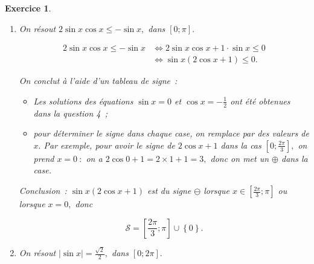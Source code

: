 \documentclass[10pt]{article}
\newtheorem{exo}{Exercice}
\begin{document}
\begin{exo}
\begin{enumerate}
\textbf{Remarque~:} Les solutions dans la partie basse du cercle correspondent à l'intervalle $\left[-\pi;-\frac{\pi}{4}\right],$ les  solutions dans la partie haute correspondent à l'intervalle $\left[\frac{\pi}{4};\pi\right].$
 


\item \begin{multicols}{2} On résout $2\sin x\cos x\leq -\sin x,$ dans $\left[0;\pi\right].$

\medskip

\begin{align*}2\sin x\cos x\leq-\sin x&\iff 2\sin x\cos x+1\cdot\sin x\leq 0
\\&\iff \sin x(2\cos x+1)\leq 0.
\end{align*}

On conclut à l'aide d'un tableau de signe~:

\begin{itemize}
\item[\textbullet] Les solutions des équations $\sin x=0$ et $\cos x=-\frac{1}{2}$ ont été obtenues dans la question 4~;
\item[\textbullet] pour déterminer le signe dans chaque case, on remplace par des valeurs de $x.$ Par exemple, pour avoir le signe de $2\cos x+1$ dans la cas $\left[0;\frac{2\pi}{3}\right],$ on prend $x=0~:$ on a $2\cos 0+1=2\times 1+1=3,$ donc on met un $\oplus$ dans la case.
\end{itemize}

\medskip
\begin{center}
\end{center}

\medskip
 
Conclusion~: $\sin x(2\cos x+1)$ est du signe $\ominus$ lorsque  $x\in\left[\frac{2\pi}{3};\pi\right]$ ou lorsque $x=0,$ donc

 \[\boxed{\mathcal{S}=\left[\frac{2\pi}{3};\pi\right]\cup\left\{0\right\}.}\]


\end{multicols}

\item \begin{multicols}{2} On résout $\left|\sin x\right|=\frac{\sqrt{2}}{2},$ dans $\left[0;2\pi\right].$


\end{multicols}
\end{enumerate}
\end{exo}
\end{document}
